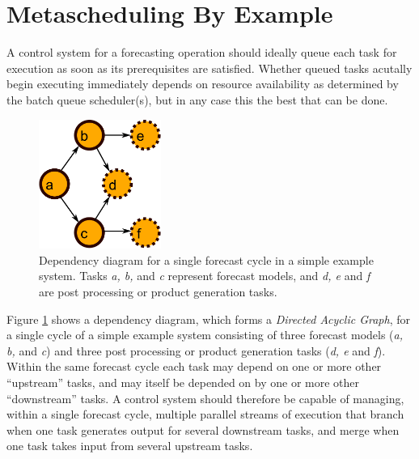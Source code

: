 \documentclass[11pt,a4paper]{article}
\begin{document}
\section{Metascheduling By Example}

A control system for a forecasting operation should ideally queue each
task for execution as soon as its prerequisites are satisfied. Whether
queued tasks acutally begin executing immediately depends on resource
availability as determined by the batch queue scheduler(s), but in any
case this the best that can be done. 

\begin{figure} 
    \begin{center}
    \includegraphics[width=4cm]{dependencies-one} 
    \end{center}
    \caption{\small Dependency diagram for a single forecast cycle in a
    simple example system. Tasks {\em a, b,} and {\em c} represent
    forecast models, and {\em d, e} and {\em f} are post processing or
    product generation tasks.} 
    \label{fig-dep-one} 
\end{figure} 

Figure \ref{fig-dep-one} shows a dependency diagram, which forms a
{\em Directed Acyclic Graph}, for a single cycle of a simple example
system consisting of three forecast models ({\em a, b,} and {\em c}) and
three post processing or product generation tasks ({\em d, e} and {\em
f}).  Within the same forecast cycle each task may depend on one or
more other ``upstream'' tasks, and may itself be depended on by one or
more other ``downstream'' tasks.  A control system should therefore be
capable of managing, within a single forecast cycle, multiple parallel
streams of execution that branch when one task generates output for
several downstream tasks, and merge when one task takes input from
several upstream tasks. 
\end{document}
